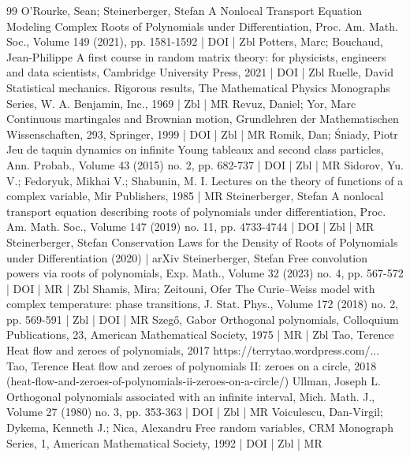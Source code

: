 \documentclass[10pt]{amsart}
\theoremstyle{definition}\newtheorem{defi}[theo]{Definition}\newtheorem{rema}[theo]{Remark}\newtheorem{exam}[theo]{Example}\newtheorem{exem}[theo]{Example}\newtheorem{nota}[theo]{Notation}
\begin{document}
\begin{thebibliography}{99}
O’Rourke, Sean; Steinerberger, Stefan A Nonlocal Transport Equation Modeling Complex Roots of Polynomials under Differentiation, Proc. Am. Math. Soc., Volume 149 (2021), pp. 1581-1592 | DOI | Zbl
Potters, Marc; Bouchaud, Jean-Philippe A first course in random matrix theory: for physicists, engineers and data scientists, Cambridge University Press, 2021 | DOI | Zbl
Ruelle, David Statistical mechanics. Rigorous results, The Mathematical Physics Monographs Series, W. A. Benjamin, Inc., 1969 | Zbl | MR
Revuz, Daniel; Yor, Marc Continuous martingales and Brownian motion, Grundlehren der Mathematischen Wissenschaften, 293, Springer, 1999 | DOI | Zbl | MR
Romik, Dan; Śniady, Piotr Jeu de taquin dynamics on infinite Young tableaux and second class particles, Ann. Probab., Volume 43 (2015) no. 2, pp. 682-737 | DOI | Zbl | MR
Sidorov, Yu. V.; Fedoryuk, Mikhai V.; Shabunin, M. I. Lectures on the theory of functions of a complex variable, Mir Publishers, 1985 | MR
Steinerberger, Stefan A nonlocal transport equation describing roots of polynomials under differentiation, Proc. Am. Math. Soc., Volume 147 (2019) no. 11, pp. 4733-4744 | DOI | Zbl | MR
Steinerberger, Stefan Conservation Laws for the Density of Roots of Polynomials under Differentiation (2020) | arXiv
Steinerberger, Stefan Free convolution powers via roots of polynomials, Exp. Math., Volume 32 (2023) no. 4, pp. 567-572 | DOI | MR | Zbl
Shamis, Mira; Zeitouni, Ofer The Curie–Weiss model with complex temperature: phase transitions, J. Stat. Phys., Volume 172 (2018) no. 2, pp. 569-591 | Zbl | DOI | MR
Szegő, Gabor Orthogonal polynomials, Colloquium Publications, 23, American Mathematical Society, 1975 | MR | Zbl
Tao, Terence Heat flow and zeroes of polynomials, 2017 https://terrytao.wordpress.com/...
Tao, Terence Heat flow and zeroes of polynomials II: zeroes on a circle, 2018 (heat-flow-and-zeroes-of-polynomials-ii-zeroes-on-a-circle/)
Ullman, Joseph L. Orthogonal polynomials associated with an infinite interval, Mich. Math. J., Volume 27 (1980) no. 3, pp. 353-363 | DOI | Zbl | MR
Voiculescu, Dan-Virgil; Dykema, Kenneth J.; Nica, Alexandru Free random variables, CRM Monograph Series, 1, American Mathematical Society, 1992 | DOI | Zbl | MR

\end{thebibliography}
\end{document}
